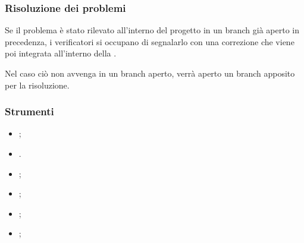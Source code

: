 \subsubsection{Risoluzione dei problemi}
\par Se il problema è stato rilevato all'interno del progetto in un branch già aperto in precedenza, i verificatori si occupano di segnalarlo con una correzione che viene poi integrata all'interno della . 
\par Nel caso ciò non avvenga in un branch aperto, verrà aperto un branch apposito per la risoluzione. 

\subsubsection{Strumenti}
\begin{itemize}
    \item {};
    \item {}.
    \item {};
    \item {};
    \item {};
    \item {};
\end{itemize}